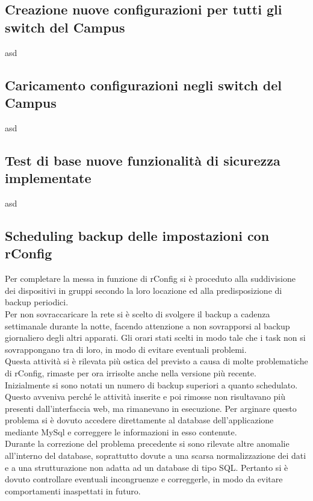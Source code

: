 \documentclass[Realizzazione.tex]{subfiles}
\begin{document}
\subsection{Creazione nuove configurazioni per tutti gli switch del Campus} 
asd
\subsection{Caricamento configurazioni negli switch del Campus} 
asd
\subsection{Test di base nuove funzionalità di sicurezza implementate} 
asd

\subsection{Scheduling backup delle impostazioni con rConfig}

Per completare la messa in funzione di rConfig si è proceduto alla suddivisione dei dispositivi in gruppi secondo la loro locazione ed alla predisposizione di backup periodici. \\
Per non sovraccaricare la rete si è scelto di svolgere il backup a cadenza settimanale durante la notte, facendo attenzione a non sovrapporsi al backup giornaliero degli altri apparati. Gli orari stati scelti in modo tale che i task non si sovrappongano tra di loro, in modo di evitare eventuali problemi.\\

Questa attività si è rilevata più ostica del previsto a causa di molte problematiche di rConfig, rimaste per ora irrisolte anche nella versione più recente. \\
Inizialmente si sono notati un numero di backup superiori a quanto schedulato. Questo avveniva perché le attività inserite e poi rimosse non risultavano più presenti dall'interfaccia web, ma rimanevano in esecuzione. Per arginare questo problema si è dovuto accedere direttamente al database dell'applicazione mediante MySql e correggere le informazioni in esso contenute. \\
Durante la correzione del problema precedente si sono rilevate altre anomalie all'interno del database, soprattutto dovute a una scarsa normalizzazione dei dati e a una strutturazione non adatta ad un database di tipo SQL. Pertanto si è dovuto controllare eventuali incongruenze e correggerle, in modo da evitare comportamenti inaspettati in futuro. \\
\end{document}
